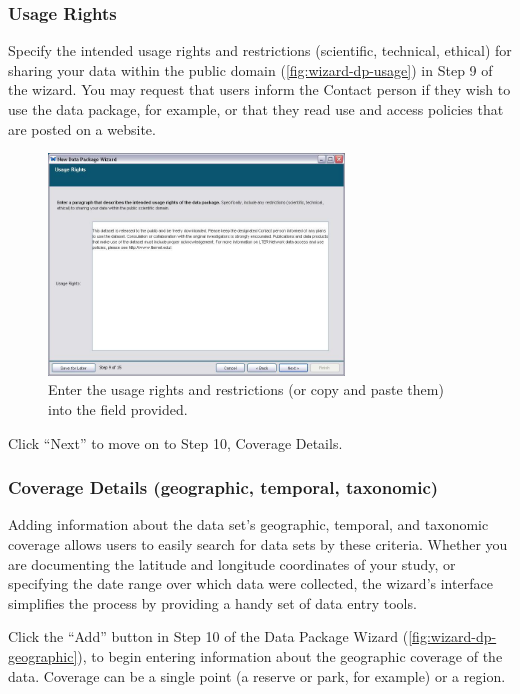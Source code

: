 \subsubsection{Usage Rights} \label{sec:wizard-dp-usage}

Specify the intended usage rights and restrictions (scientific,
technical, ethical) for sharing your data within the public domain
(\autoref{fig:wizard-dp-usage}) in Step 9 of the wizard. You may request
that users inform the Contact person if they wish to use the data
package, for example, or that they read use and access policies that are
posted on a website.

\begin{figure}
  \centering
    \includegraphics[width=0.7\textwidth]{images/wizard-dp-usage.jpg}
  \caption{Enter the usage rights and restrictions (or copy and paste
    them) into the field provided.}
  \label{fig:wizard-dp-usage}
\end{figure}

Click ``Next'' to move on to Step 10, Coverage Details.

\subsubsection[Coverage Details]{Coverage Details (geographic, temporal,
  taxonomic)} \label{sec:wizard-dp-coverage}

Adding information about the data set's geographic, temporal, and
taxonomic coverage allows users to easily search for data sets by these
criteria. Whether you are documenting the latitude and longitude
coordinates of your study, or specifying the date range over which data
were collected, the wizard's interface simplifies the process by
providing a handy set of data entry tools.

Click the ``Add'' button in Step 10 of the Data Package Wizard
(\autoref{fig:wizard-dp-geographic}), to begin entering information
about the geographic coverage of the data. Coverage can be a single
point (a reserve or park, for example) or a region.


